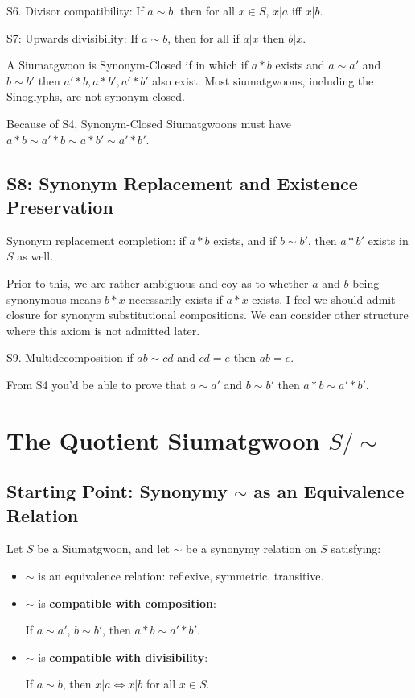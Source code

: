 \begin{axiom}\label{ax:syn-div}
S6. Divisor compatibility: If $a \sim b$, then for all $x \in S$, $x|a$ iff $x|b$.
\end{axiom}

\begin{axiom}\label{ax:syn-up}
S7: Upwards divisibility: If $a\sim b$, then for all if $a|x$ then $b|x$.
\end{axiom}

A Siumatgwoon is Synonym-Closed if in which if $a*b$ exists and $a\sim a'$ and $b\sim b'$ then $a'*b, a*b', a'*b'$ also exist. Most siumatgwoons, including the Sinoglyphs, are not synonym-closed. 

Because of S4, Synonym-Closed Siumatgwoons must have $a*b \sim a'*b \sim a*b'\sim a'*b'$.

\subsection{S8: Synonym Replacement and Existence Preservation}

Synonym replacement completion: if $a*b$ exists, and if $b\sim b'$, then $a*b'$ exists in $S$ as well.

Prior to this, we are rather ambiguous and coy as to whether $a$ and $b$ being synonymous means $b*x$ necessarily exists if $a*x$ exists. I feel we should admit closure for synonym substitutional compositions. We can consider other structure where this axiom is not admitted later.

S9. Multidecomposition if $ab \sim cd$ and $cd = e$ then $ab =e$. 

From S4 you'd be able to prove that $a \sim a'$ and $b\sim b'$ then $a * b \sim a' * b'$.

\section{The Quotient Siumatgwoon $S/\sim$}

\subsection{Starting Point: Synonymy $\sim$ as an Equivalence Relation}

Let $S$ be a Siumatgwoon, and let $\sim$ be a synonymy relation on $S$ satisfying:

\begin{itemize}
\item $\sim$ is an equivalence relation: reflexive, symmetric, transitive.
\item $\sim$ is \textbf{compatible with composition}:
    
    If $a\sim a'$, $b\sim b'$, then $a*b\sim a'*b'$.
    
\item $\sim$ is \textbf{compatible with divisibility}:
    
    If $a\sim b$, then $x|a \iff x|b$ for all $x\in S$.
\end{itemize}

